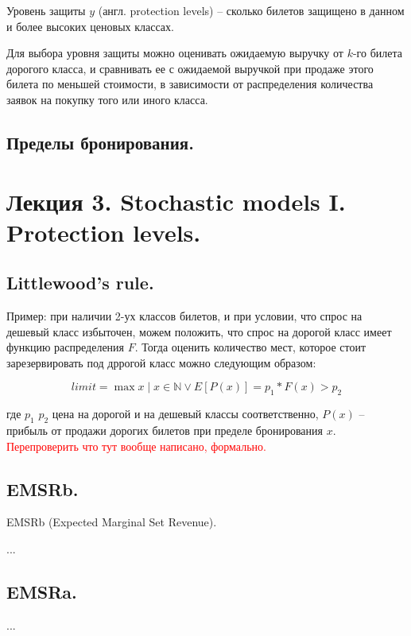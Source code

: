 \documentclass[reqno]{article}
\theoremstyle{definition}
\theoremstyle{definition}
\theoremstyle{definition}
\theoremstyle{definition}
\theoremstyle{definition}
\theoremstyle{definition}
\theoremstyle{definition}
\theoremstyle{definition}
\theoremstyle{definition}
\begin{document}
		Уровень защиты $y$ (англ. protection levels) -- сколько билетов защищено в данном и более высоких ценовых классах.
		
		Для выбора уровня защиты можно оценивать ожидаемую выручку от $k$-го билета дорогого класса, и сравнивать ее с ожидаемой выручкой при продаже этого билета по меньшей стоимости, в зависимости от распределения количества заявок на покупку того или иного класса.
		
		
		\subsection{Пределы бронирования.}
		
		
		
		
		
		\newpage
		\section{Лекция 3. Stochastic models I. Protection levels.}
		
		\subsection{Littlewood's rule.}
		
		Пример: при наличии 2-ух классов билетов, и при условии, что спрос на дешевый класс избыточен, можем положить, что спрос на дорогой класс имеет функцию распределения ${F}$. Тогда оценить количество мест, которое стоит зарезервировать под дррогой класс можно следующим образом:
		
		$$limit = \max x \mid x \in \mathds{N} \vee E[P(x)] = p_1 * F(x) > p_2$$
		
		где $p_1$ $p_2$ цена на дорогой и на дешевый классы соответственно, $P(x)$ -- прибыль от продажи дорогих билетов при пределе бронирования $x$. \textcolor{red}{Перепроверить что тут вообще написано, формально.}
		
		\subsection{EMSRb.}
		
		EMSRb (Expected Marginal Set Revenue).
		
		...
		
		
		\subsection{EMSRa.}
		...
		
\end{document}
